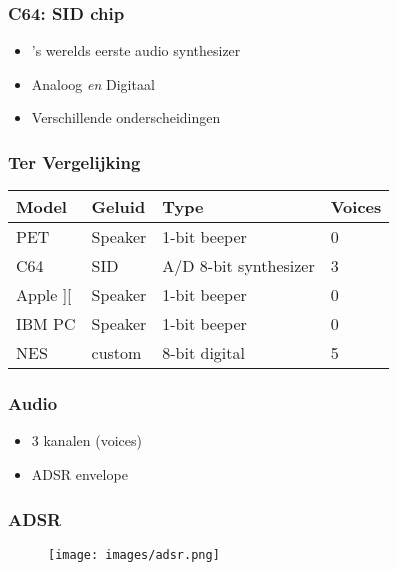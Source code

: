 \documentclass[aspectratio=43]{uva-inf-presentation}
\begin{document}

\begin{frame}
\frametitle{C64: SID chip}

\begin{itemize}
\item 's werelds eerste audio synthesizer
\item Analoog \emph{en} Digitaal
\item Verschillende onderscheidingen
\end{itemize}

\end{frame}


\begin{frame}
\frametitle{Ter Vergelijking}

\begin{tabular}{|l|l|l|l|}
\hline Model & Geluid & Type & Voices \\ \hline
PET & Speaker & 1-bit beeper & 0 \\
C64 & SID & A/D 8-bit synthesizer & 3 \\ \hline
Apple ][ & Speaker & 1-bit beeper & 0 \\
IBM PC & Speaker & 1-bit beeper & 0 \\
NES & custom & 8-bit digital & 5 \\ \hline
\end{tabular}

\end{frame}


\begin{frame}
\frametitle{Audio}

\begin{itemize}
\item 3 kanalen (voices)
\item ADSR envelope
\end{itemize}

\end{frame}


\begin{frame}
\frametitle{ADSR}

\begin{figure}
\texttt{[image: images/adsr.png]}
\end{figure}

\end{frame}
\end{document}
